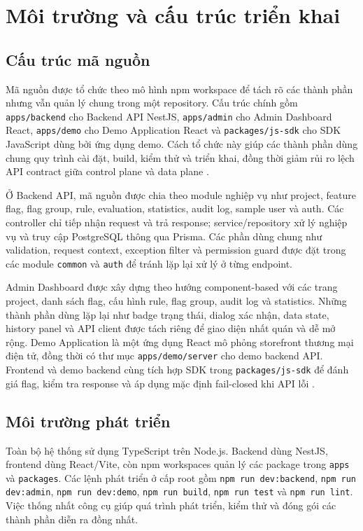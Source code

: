 \section{Môi trường và cấu trúc triển khai}

\subsection{Cấu trúc mã nguồn}

Mã nguồn được tổ chức theo mô hình npm workspace để tách rõ các thành phần nhưng vẫn quản lý chung trong một repository. Cấu trúc chính gồm \texttt{apps/backend} cho Backend API NestJS, \texttt{apps/admin} cho Admin Dashboard React, \texttt{apps/demo} cho Demo Application React và \texttt{packages/js-sdk} cho SDK JavaScript dùng bởi ứng dụng demo. Cách tổ chức này giúp các thành phần dùng chung quy trình cài đặt, build, kiểm thử và triển khai, đồng thời giảm rủi ro lệch API contract giữa control plane và data plane \cite{microsoft_devops,docker_compose}.

Ở Backend API, mã nguồn được chia theo module nghiệp vụ như project, feature flag, flag group, rule, evaluation, statistics, audit log, sample user và auth. Các controller chỉ tiếp nhận request và trả response; service/repository xử lý nghiệp vụ và truy cập PostgreSQL thông qua Prisma. Các phần dùng chung như validation, request context, exception filter và permission guard được đặt trong các module \texttt{common} và \texttt{auth} để tránh lặp lại xử lý ở từng endpoint.

Admin Dashboard được xây dựng theo hướng component-based với các trang project, danh sách flag, cấu hình rule, flag group, audit log và statistics. Những thành phần dùng lặp lại như badge trạng thái, dialog xác nhận, data state, history panel và API client được tách riêng để giao diện nhất quán và dễ mở rộng. Demo Application là một ứng dụng React mô phỏng storefront thương mại điện tử, đồng thời có thư mục \texttt{apps/demo/server} cho demo backend API. Frontend và demo backend cùng tích hợp SDK trong \texttt{packages/js-sdk} để đánh giá flag, kiểm tra response và áp dụng mặc định fail-closed khi API lỗi \cite{openfeature_flag_evaluation}.

\subsection{Môi trường phát triển}

Toàn bộ hệ thống sử dụng TypeScript trên Node.js. Backend dùng NestJS, frontend dùng React/Vite, còn npm workspaces quản lý các package trong \texttt{apps} và \texttt{packages}. Các lệnh phát triển ở cấp root gồm \texttt{npm run dev:backend}, \texttt{npm run dev:admin}, \texttt{npm run dev:demo}, \texttt{npm run build}, \texttt{npm run test} và \texttt{npm run lint}. Việc thống nhất công cụ giúp quá trình phát triển, kiểm thử và đóng gói các thành phần diễn ra đồng nhất.

